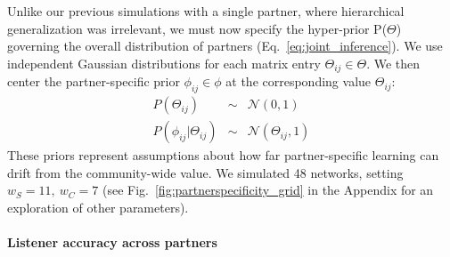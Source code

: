 Unlike our previous simulations with a single partner, where hierarchical generalization was irrelevant, we must now specify the hyper-prior P($\Theta$) governing the overall distribution of partners (Eq.~\ref{eq:joint_inference}).
We use independent Gaussian distributions for each matrix entry $\Theta_{ij} \in \Theta$.
We then center the partner-specific prior $\phi_{ij} \in \phi$ at the corresponding value $\Theta_{ij}$:
$$\begin{array}{rcl}
P(\Theta_{ij}) & \sim & \mathcal{N}(0, 1)\\
P(\phi_{ij} | \Theta_{ij}) & \sim & \mathcal{N}(\Theta_{ij}, 1)
\end{array}$$
These priors represent assumptions about how far partner-specific learning can drift from the community-wide value.
We simulated 48 networks, setting $w_S = 11,~w_C = 7$ (see Fig.~\ref{fig:partnerspecificity_grid} in the Appendix for an exploration of other parameters).


\paragraph{Listener accuracy across partners}

